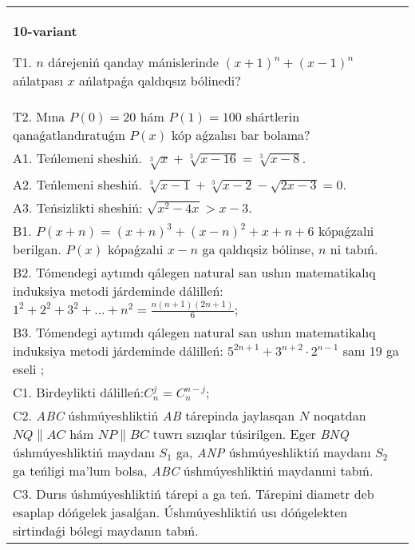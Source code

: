 \documentclass{article}
\begin{document}
\begin{tabular}{m{17cm}}
\textbf{10-variant}
\newline

T1. \(n\) dárejeniń qanday mánislerinde \((x + 1)^{n} + (x - 1)^{n}\) ańlatpası \(x\) ańlatpaǵa qaldıqsız bólinedi? \\
T2. Mına \(P(0) = 20\) hám \(P(1) = 100\) shártlerin qanaǵatlandıratuǵın \(P(x)\) kóp aǵzalısı bar bolama? \\
A1. Teńlemeni sheshiń. \(\sqrt[3]{x} + \sqrt[3]{x - 16} = \sqrt[3]{x - 8}\). \\
A2. Teńlemeni sheshiń. \(\sqrt[3]{x - 1} + \sqrt[3]{x - 2} - \sqrt{2x - 3} = 0\). \\
A3. Teńsizlikti sheshiń: \(\sqrt{x^{2} - 4x} > x - 3\). \\
B1. \(P(x + n) = (x + n)^{3} + (x - n)^{2} + x + n + 6\) kópaǵzalıi berilgan. \(P(x)\) kópaǵzalıi \(x - n\) ga qaldıqsiz bólinse, \(n\) ni tabıń. \\
B2. Tómendegi aytımdı qálegen natural san ushın matematikalıq induksiya metodi járdeminde dálilleń: \(1^{2} + 2^{2} + 3^{2} + ... + n^{2} = \frac{n(n + 1)(2n + 1)}{6}\); \\
B3. Tómendegi aytımdı qálegen natural san ushın matematikalıq induksiya metodi járdeminde dálilleń: \(5^{2n + 1} + 3^{n + 2} \cdot 2^{n - 1}\) sanı 19 ga eseli ; \\
C1. Birdeylikti dálilleń:\(C_{n}^{j} = C_{n}^{n - j}\); \\
C2. \emph{ABC} úshmúyeshliktiń \emph{AB} tárepinda jaylasqan \(N\) noqatdan \(NQ\| AC\) hám \(NP\| BC\) tuwrı sızıqlar túsirilgen. Eger \emph{BNQ} úshmúyeshliktiń maydanı \(S_{1}\) ga, \emph{ANP} úshmúyeshliktiń maydanı \(S_{2}\) ga teńligi ma'lum bolsa, \emph{ABC} úshmúyeshliktiń maydanıni tabıń. \\
C3. Durıs úshmúyeshliktiń tárepi a ga teń. Tárepini diametr deb esaplap dóńgelek jasalǵan. Úshmúyeshliktiń usı dóńgelekten sirtindaǵi bólegi maydanın tabıń. \\

\end{tabular}
\vspace{1cm}
\end{document}
